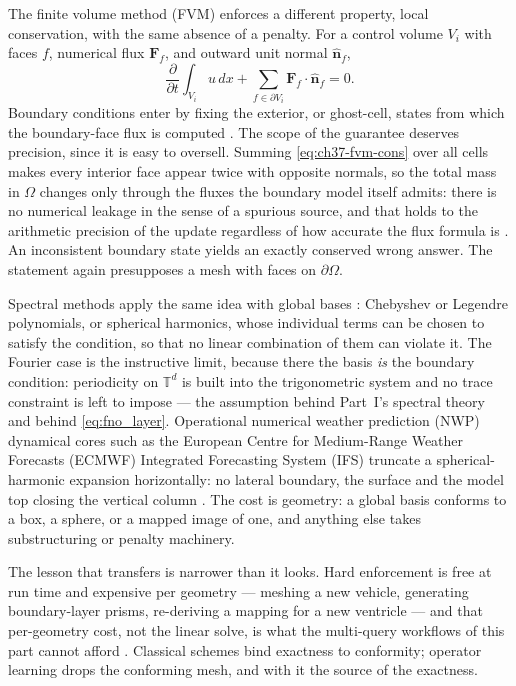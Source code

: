 The finite volume method (FVM) enforces a different property, local conservation, with the same
absence of a penalty. For a control volume $V_i$ with faces $f$, numerical flux $\mathbf{F}_f$, and
outward unit normal $\hat{\mathbf{n}}_f$,
\begin{equation}
  \label{eq:ch37-fvm-cons}
  \frac{\partial}{\partial t} \int_{V_i} u \, dx + \sum_{f \in \partial V_i} \mathbf{F}_f \cdot \hat{\mathbf{n}}_f = 0 .
\end{equation}
Boundary conditions enter by fixing the exterior, or ghost-cell, states from which the boundary-face
flux is computed . The scope of the guarantee deserves precision, since it is easy
to oversell. Summing \eqref{eq:ch37-fvm-cons} over all cells makes every interior face appear twice
with opposite normals, so the total mass in $\Omega$ changes only through the fluxes the boundary
model itself admits: there is no numerical leakage in the sense of a spurious source, and that holds
to the arithmetic precision of the update regardless of how accurate the flux formula is
\cite{leveque2002finite}. An inconsistent boundary state
yields an exactly conserved wrong answer. The statement again presupposes a mesh with faces on
$\partial\Omega$.

Spectral methods apply the same idea with global bases
: Chebyshev or Legendre polynomials, or spherical
harmonics, whose individual terms can be chosen to satisfy the condition, so that no linear
combination of them can violate it. The Fourier case is the instructive limit, because there the
basis \emph{is} the boundary condition: periodicity on $\mathbb{T}^d$ is built into the trigonometric
system and no trace constraint is left to impose --- the assumption behind Part~I's spectral theory
and behind \eqref{eq:fno_layer}. Operational numerical weather prediction (NWP) dynamical
cores such as the European Centre for Medium-Range Weather Forecasts (ECMWF) Integrated Forecasting
System (IFS) truncate a spherical-harmonic expansion horizontally: no lateral boundary, the
surface and the model top closing the vertical column
. The cost is
geometry: a global basis conforms to a box, a sphere, or a mapped image of one, and anything else
takes substructuring or penalty machinery.

The lesson that transfers is narrower than it looks. Hard enforcement is free at run time and
expensive per geometry --- meshing a new vehicle, generating boundary-layer prisms, re-deriving a
mapping for a new ventricle --- and that per-geometry cost, not the linear solve, is what the
multi-query workflows of this part cannot afford
. Classical schemes bind exactness to conformity;
operator learning drops the conforming mesh, and with it the source of the exactness.

